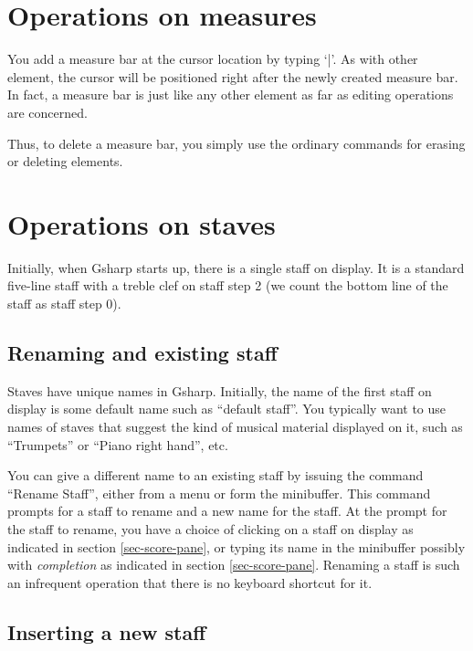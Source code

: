 \documentclass[11pt]{book}
\def\gs{Gsharp}
\def\kbd#1{`#1'}
\def\command#1{``#1''}
\begin{document}
\chapter{Operations on measures}

You add a measure bar at the cursor location by typing \kbd{|}.  As
with other element, the cursor will be positioned right after the
newly created measure bar.  In fact, a measure bar is just like any
other element as far as editing operations are concerned.

Thus, to delete a measure bar, you simply use the ordinary commands
for erasing or deleting elements.

\chapter{Operations on staves}
\label{chap-op-staves}

Initially, when {\gs} starts up, there is a single staff on display.
It is a standard five-line staff with a treble clef on staff step 2
(we count the bottom line of the staff as staff step 0).

\section{Renaming and existing staff}

Staves have unique names in {\gs}.  Initially, the name of the first
staff on display is some default name such as ``default staff''.  You
typically want to use names of staves that suggest the kind of musical
material displayed on it, such as ``Trumpets'' or ``Piano right
hand'', etc. 

You can give a different name to an existing staff by issuing the
command \command{Rename Staff}, either from a menu or form the
minibuffer.  This command prompts for a staff to rename and a new name
for the staff.  At the prompt for the staff to rename, you have a
choice of clicking on a staff on display as indicated in section
\ref{sec-score-pane}, or typing its name in the minibuffer possibly
with \emph{completion} as indicated in section
\ref{sec-score-pane}.  Renaming a staff is such an infrequent
operation that there is no keyboard shortcut for it.

\section{Inserting a new staff}
\label{sec-inserting-staff}
\end{document}

